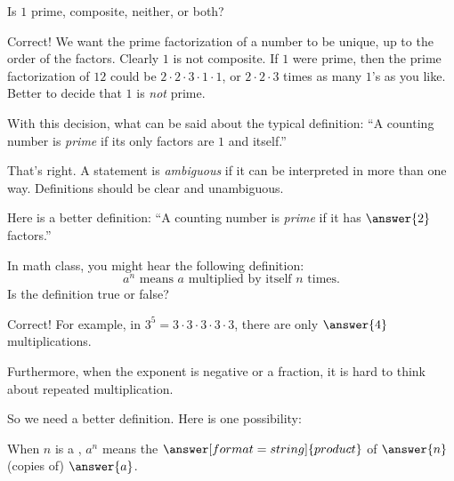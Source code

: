 \documentclass[nooutcomes]{ximera}
\begin{document}
\begin{problem}
Is $1$ prime, composite, neither, or both?  
\begin{multipleChoice}
\end{multipleChoice}

\begin{problem}
Correct!  We want the prime factorization of a number to be unique, up to the order of the factors.  Clearly $1$ is not composite.  If $1$ were prime, then the prime factorization of $12$ could be $2\cdot 2\cdot 3 \cdot 1\cdot 1$, or $2\cdot 2\cdot 3$ times as many $1$'s as you like.  Better to decide that $1$ is \emph{not} prime.  

With this decision, what can be said about the typical definition: ``A counting number is \emph{prime} if its only factors are $1$ and itself.''
\begin{multipleChoice}
\end{multipleChoice}
\begin{problem}
That's right.  A statement is \emph{ambiguous} if it can be interpreted in more than one way.  Definitions should be clear and unambiguous.

\begin{prompt}
Here is a better definition:  ``A counting number is \emph{prime} if it has 
 $\answer{2}$ factors.''
\end{prompt}
\end{problem}
\end{problem}
\end{problem}


\begin{problem}
In math class, you might hear the following definition:  
\[
a^n\text{ means }a\text{ multiplied by itself }n\text{ times.}  
\]
Is the definition true or false?  
\begin{multipleChoice}
\end{multipleChoice}
\begin{problem}
Correct!  For example, in $3^5=3\cdot3\cdot3\cdot3\cdot3$, there are only $\answer{4}$ multiplications.  

Furthermore, when the exponent is negative or a fraction, it is hard to think about repeated multiplication.  

So we need a better definition.  Here is one possibility: 

When $n$ is a , $a^n$ means the $\answer[format=string]{product}$ of $\answer{n}$ (copies of) $\answer{a}$.
\end{problem}
\end{problem}
\end{document}
